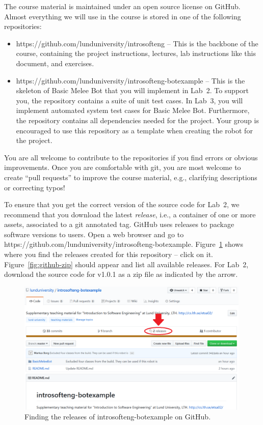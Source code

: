 \documentclass{scrreprt}
\begin{document}
The course material is maintained under an open source license on GitHub. Almost everything we will use in the course is stored in one of the following repositories:
\begin{itemize}
\item https://github.com/lunduniversity/introsofteng -- This is the backbone of the course, containing the project instructions, lectures, lab instructions like this document, and exercises.
\item https://github.com/lunduniversity/introsofteng-botexample -- This is the skeleton of Basic Melee Bot that you will implement in Lab~2. To support you, the repository contains a suite of unit test cases. In Lab~3, you will implement automated system test cases for Basic Melee Bot. Furthermore, the repository contains all dependencies needed for the project. Your group is encouraged to use this repository as a template when creating the robot for the project.
\end{itemize}

You are all welcome to contribute to the repositories if you find errors or obvious improvements. Once you are comfortable with git, you are most welcome to create ``pull requests'' to improve the course material, e.g., clarifying descriptions or correcting typos!

To ensure that you get the correct version of the source code for Lab~2, we recommend that you download the latest \textit{release}, i.e., a container of one or more assets, associated to a git annotated tag. GitHub uses releases to package software versions to users. Open a web browser and go to https://github.com/lunduniversity/introsofteng-botexample. Figure~\ref{fig:github-release} shows where you find the releases created for this repository -- click on it. Figure~\ref{fig:github-zip} should appear and list all available releases. For Lab~2, download the source code for v1.0.1 as a zip file as indicated by the arrow.

\begin{figure}
\centering
\includegraphics[width=0.99\textwidth]{figures/GitHub-release.png}
\caption{Finding the releases of introsofteng-botexample on GitHub.}
\label{fig:github-release}
\end{figure}
\end{document}
